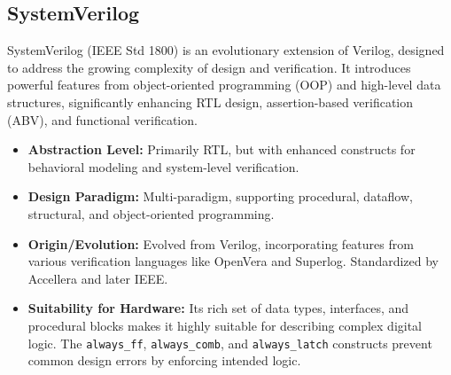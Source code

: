 \documentclass[sigconf, anonymous=false]{acmart} %
\begin{document}
\subsection{SystemVerilog}
SystemVerilog (IEEE Std 1800) is an evolutionary extension of Verilog, designed to address the growing complexity of design and verification. It introduces powerful features from object-oriented programming (OOP) and high-level data structures, significantly enhancing RTL design, assertion-based verification (ABV), and functional verification.
\begin{itemize}
    \item \textbf{Abstraction Level:} Primarily RTL, but with enhanced constructs for behavioral modeling and system-level verification.
    \item \textbf{Design Paradigm:} Multi-paradigm, supporting procedural, dataflow, structural, and object-oriented programming.
    \item \textbf{Origin/Evolution:} Evolved from Verilog, incorporating features from various verification languages like OpenVera and Superlog. Standardized by Accellera and later IEEE.
    \item \textbf{Suitability for Hardware:} Its rich set of data types, interfaces, and procedural blocks makes it highly suitable for describing complex digital logic. The \texttt{always\_ff}, \texttt{always\_comb}, and \texttt{always\_latch} constructs prevent common design errors by enforcing intended logic.

    
\end{itemize}
\end{document}
